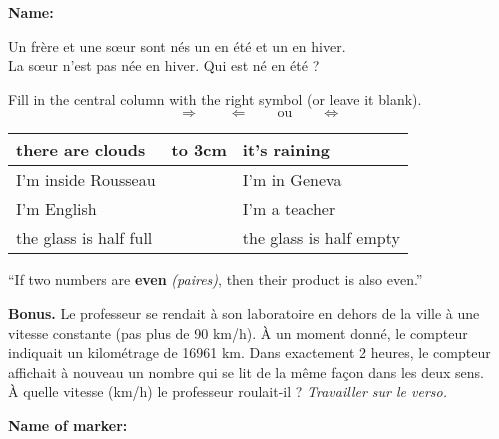 \documentclass[12pt]{exam}
\begin{document}
\textbf{Name:} \dotfill

\begin{questions}


\question[1] Un frère et une sœur sont nés un en été et un en hiver. \\
La sœur n'est pas née en hiver.
Qui est né en été ?

\fillwithdottedlines{7mm}

\question[4] Fill in the central column with the right symbol (or leave it blank).
\vspace{-4mm}
$$ \Rightarrow \qquad \Leftarrow \qquad \mathrm{ou} \qquad  \Leftrightarrow$$
\vspace{-12mm}
\begin{center}
\begin{tabular}{|l|l|l|}
\hline
there are clouds           & \hbox to 3cm{} & it's raining              \\ \hline
I'm inside Rousseau         &  & I'm in Geneva      \\ \hline
I'm English             &  & I'm a teacher       \\ \hline
the glass is half full &  & the glass is half empty \\ \hline
\end{tabular}
\end{center}

\question[4] ``If two numbers are \textbf{even} \emph{(paires)}, then their product is also even.''

\question \textbf{Bonus.} Le professeur se rendait à son laboratoire en dehors de la ville à une vitesse constante (pas plus de 90 km/h).
À un moment donné, le compteur indiquait un kilométrage de 16961 km. Dans exactement 2 heures, le compteur affichait à nouveau un nombre qui se lit de la même façon dans les deux sens. \\
À quelle vitesse (km/h) le professeur roulait-il ? \hfill \emph{Travailler sur le verso.}

\end{questions}

\vfill

\begin{tcolorbox}

\textbf{Name of marker:}

\begin{center}
\gradetable[h][questions]
\end{center}

\end{tcolorbox}
\end{document}
